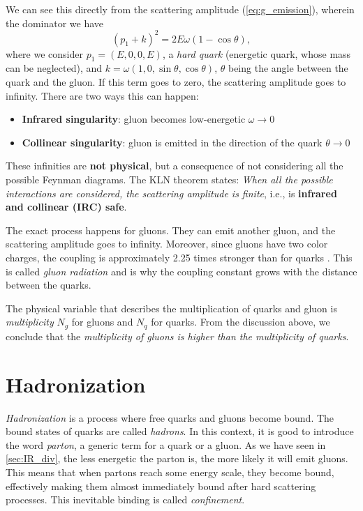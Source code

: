 We can see this directly from the scattering amplitude (\ref{eq:g_emission}), wherein the dominator we have
\begin{equation}
    \label{eq:IR_sing}
    (p_1+k)^2 = 2E\omega(1- \cos{\theta}),
\end{equation}
where we consider $p_1 = (E,0,0,E)$, a \emph{hard quark} (energetic quark, whose mass can be neglected), and $k = \omega (1, 0, \sin{\theta}, \cos{\theta})$, $\theta$ being the angle between the quark and the gluon.
If this term goes to zero, the scattering amplitude goes to infinity.
There are two ways this can happen: 
\begin{itemize}
    \item \textbf{Infrared singularity}: gluon becomes low-energetic $\omega \rightarrow 0$
    \item \textbf{Collinear singularity}: gluon is emitted in the direction of the quark $\theta \rightarrow 0$
\end{itemize}
These infinities are \textbf{not physical}, but a consequence of not considering all the possible Feynman diagrams.
The KLN theorem \cite{IR_sing_K,IR_sing_LN} states: \emph{When all the possible interactions are considered, the scattering amplitude is finite}, i.e., is \textbf{infrared and collinear (IRC) safe}. 

The exact process happens for gluons. 
They can emit another gluon, and the scattering amplitude goes to infinity.
Moreover, since gluons have two color charges, the coupling is approximately 2.25 times stronger than for quarks \cite{qcd_salam}.
This is called \emph{gluon radiation} and is why the coupling constant grows with the distance between the quarks.

The physical variable that describes the multiplication of quarks and gluon is \emph{multiplicity} $N_g$ for gluons and $N_q$ for quarks.
From the discussion above, we conclude that the \emph{multiplicity of gluons is higher than the multiplicity of quarks}.

\section{Hadronization}
\label{sec:hadronization}
\emph{Hadronization} is a process where free quarks and gluons become bound.
The bound states of quarks are called \emph{hadrons}.
In this context, it is good to introduce the word \emph{parton}, a generic term for a quark or a gluon.
As we have seen in \cref{sec:IR_div}, the less energetic the parton is, the more likely it will emit gluons.
This means that when partons reach some energy scale, they become bound, effectively making them almost immediately bound after hard scattering processes.
This inevitable binding is called \emph{confinement}.

